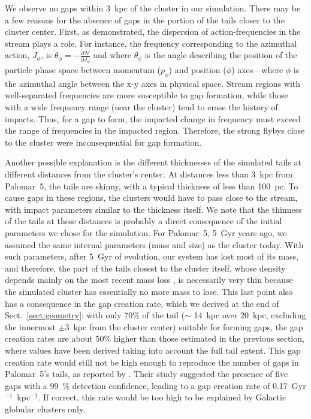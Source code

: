         We observe no gaps within 3~kpc of the cluster in our simulation. There may be a few reasons for the absence of gaps in the portion of the tails closer to the cluster center. First, as \citet{2016MNRAS.457.3817S} demonstrated, the dispersion of action-frequencies in the stream plays a role. For instance, the frequency corresponding to the azimuthal action, $J_\phi$, is $\dot\theta_\phi = - \frac{\mathcal{\partial H}}{\partial J_\phi}$ and where $\theta_\phi$ is the angle describing the position of the particle phase space between momentum ($p_\phi$) and position ($\phi$) axes---where $\phi$ is the azimuthal angle between the x-y axes in physical space. Stream regions with well-separated frequencies are more susceptible to gap formation, while those with a wide frequency range (near the cluster) tend to erase the history of impacts. Thus, for a gap to form, the imparted change in frequency must exceed the range of frequencies in the impacted region. Therefore, the strong flybys close to the cluster were inconsequential for gap formation. 

        Another possible explanation is the different thicknesses of the simulated tails at different distances from the cluster's center. At distances less than 3~kpc from Palomar~5, the tails are skinny, with a typical thickness of less than 100~pc. To cause gaps in these regions, the clusters would have to pass close to the stream, with impact parameters similar to the thickness itself. We note that the thinness of the tails at these distances is probably a direct consequence of the initial parameters we chose for the simulation. For Palomar~5, 5~Gyr years ago, we assumed the same internal parameters (mass and size) as the cluster today. With such parameters, after 5~Gyr of evolution, our system has lost most of its mass, and therefore, the part of the tails closest to the cluster itself, whose density depends mainly on the most recent mass loss \citep[see, for example, Fig.~A.3 in][]{2012A&A...546L...7M}, is necessarily very thin because the simulated cluster has essentially no more mass to lose. This last point also has a consequence in the gap creation rate, which we derived at the end of Sect.~\ref{sect:geometry}: with only 70\% of the tail  ($\sim$ 14~kpc over 20~kpc, excluding the innermost $\pm 3$~kpc from the cluster center) suitable for forming gaps, the gap creation rates are about 50$\%$ higher than those estimated in the previous section, where values have been derived taking into account the full tail extent. This gap creation rate would still not be high enough to reproduce the number of gaps in Palomar~5's tails, as reported by \citet{2012ApJ...760...75C}. Their study suggested the presence of five gaps with a 99~\% detection confidence, leading to a gap creation rate of 0.17~Gyr$^{-1}$~kpc$^{-1}$. If correct, this rate would be too high to be explained by Galactic globular clusters only. 


